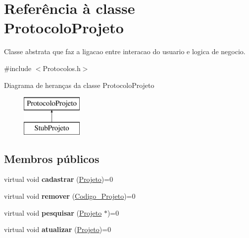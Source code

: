 \hypertarget{class_protocolo_projeto}{
\section{\-Referência à classe \-Protocolo\-Projeto}
\label{class_protocolo_projeto}
}


\-Classe abstrata que faz a ligacao entre interacao do usuario e logica de negocio.  




{\ttfamily \#include $<$\-Protocolos.\-h$>$}

\-Diagrama de heranças da classe \-Protocolo\-Projeto\begin{figure}[H]
\begin{center}
\leavevmode
\includegraphics[height=2.000000cm]{class_protocolo_projeto}
\end{center}
\end{figure}
\subsection*{\-Membros públicos}
\begin{DoxyCompactItemize}
\item 
\hypertarget{class_protocolo_projeto_aa281e86b14b63f6f3f887a2aa8a44b04}{
virtual void {\bfseries cadastrar} (\hyperlink{class_projeto}{\-Projeto})=0}
\label{class_protocolo_projeto_aa281e86b14b63f6f3f887a2aa8a44b04}

\item 
\hypertarget{class_protocolo_projeto_a083c4caec4591d509e141e97d698aa2d}{
virtual void {\bfseries remover} (\hyperlink{class_codigo___projeto}{\-Codigo\-\_\-\-Projeto})=0}
\label{class_protocolo_projeto_a083c4caec4591d509e141e97d698aa2d}

\item 
\hypertarget{class_protocolo_projeto_a6aff0de5eab0cd153e92cd379a5b9bb7}{
virtual void {\bfseries pesquisar} (\hyperlink{class_projeto}{\-Projeto} $\ast$)=0}
\label{class_protocolo_projeto_a6aff0de5eab0cd153e92cd379a5b9bb7}

\item 
\hypertarget{class_protocolo_projeto_a91a7972a99c19a9a927115f2884aa36e}{
virtual void {\bfseries atualizar} (\hyperlink{class_projeto}{\-Projeto})=0}
\label{class_protocolo_projeto_a91a7972a99c19a9a927115f2884aa36e}

\end{DoxyCompactItemize}


